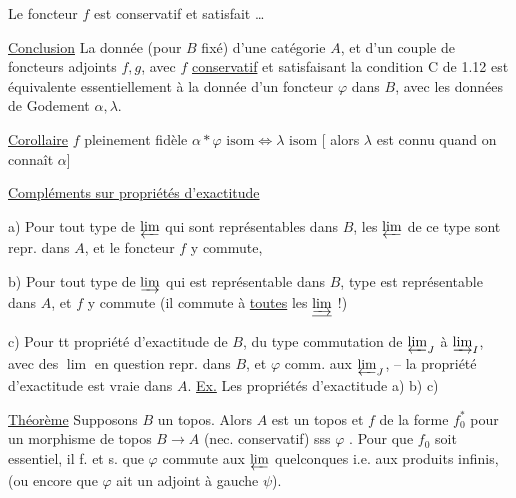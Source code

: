 Le foncteur $f$ est conservatif et satisfait  \ldots

\uline{Conclusion} La donnée (pour $B$ fixé) d'une catégorie $A$, et d'un couple de foncteurs adjoints $f,g$,
avec $f$ \uline{conservatif} et   satisfaisant la condition C de 1.12 est équivalente essentiellement à la donnée d'un foncteur $\varphi$ dans $B$, avec les données de Godement $\alpha,\lambda$.


\uline{Corollaire} $f$ pleinement fidèle \deleted{\unsure{\Longleftrightarrow}}\quad
$\alpha*\varphi\text{ isom}\Longleftrightarrow\lambda\text{ isom}$ [ alors $\lambda$ est connu quand on connaît $\alpha$]

\uline{Compléments sur propriétés d'exactitude}

a) Pour tout type de $\varprojlim$ qui sont représentables dans $B$,  les $\varprojlim$ de ce type  sont repr. dans $A$, et le foncteur $f$ y commute, 

b) Pour tout type de $\varinjlim$ qui est représentable dans $B$,  \unsure{\textquotedbl} type est représentable dans $A$, et $f$ y commute (il commute \textquotedbl à \uline{toutes} les $\underline{\varinjlim}$ !)

c) Pour tt propriété d'exactitude de $B$,  du type commutation de $\varprojlim_J$  à $\varinjlim_I$, avec des  $\lim$ en question repr. dans $B$, et $\varphi$ comm. aux $\varprojlim_J$, -- la \textquotedbl propriété d'exactitude est vraie dans $A$. \uline{Ex.} Les propriétés d'exactitude a) b) c)

\uline{Théorème} Supposons $B$ un topos. Alors $A$ est un topos et $f$ de la forme $f_0^*$ pour un morphisme de topos $B\longrightarrow A$ (nec. conservatif) sss $\varphi$  . Pour que $f_0$ soit essentiel, il f. et s. que $\varphi$ commute aux $\varprojlim$ quelconques i.e. aux produits infinis, (ou encore que $\varphi$ ait un adjoint à gauche $\psi$).

